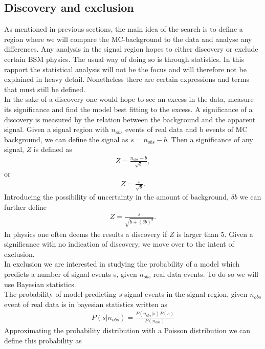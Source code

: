 \documentclass{article}
\begin{document}
\subsection{Discovery and exclusion}
As mentioned in previous sections, the main idea of the search is to define a region where we will compare the MC-background to the data and analyse any differences. Any analysis in the signal region hopes to either discovery or exclude certain BSM physics. The usual way of doing so is through statistics. In this rapport the statistical analysis will not be the focus and will therefore not be explained in heavy detail. Nonetheless there are certain expressions and terms that must still be defined.
\\
In the sake of a discovery one would hope to see an excess in the data, measure its significance and find the model best fitting to the excess. A significance of a discovery is measured by the relation between the background and the apparent signal. Given a signal region with $n_{obs}$ events of real data and b events of MC background, we can define the signal as $s = n_{obs}-b$. Then a significance of any signal, $Z$ is defined as 
\begin{align}
    Z = \frac{n_{obs}-b}{\sqrt{b}},
\end{align}
or 
\begin{align}
    Z = \frac{s}{\sqrt{b}}.
\end{align}
Introducing the possibility of uncertainty in the amount of background, $\delta b$ we can further define
\begin{align}\label{eq:Z}
    Z = \frac{s}{\sqrt{b+(\delta b)^2}}.
\end{align}
In physics one often deems the results a discovery if $Z$ is larger than 5.  Given a significance with no indication of discovery, we move over to the intent of exclusion.\\
In exclusion we are interested in studying the probability of a model which predicts a number of signal events s, given $n_{obs}$ real data events. To do so we will use Bayesian statistics.
\\
The probability of model predicting $s$ signal events in the signal region, given $n_{obs}$ event of real data is in bayesian statistics written as
\begin{align}\label{eq:bays}
    P(s|n_{obs}) = \frac{P(n_{obs}|s)P(s)}{P(n_{obs})}
\end{align}
Approximating the probability distribution with a Poisson distribution we can define this probability as
\end{document}
